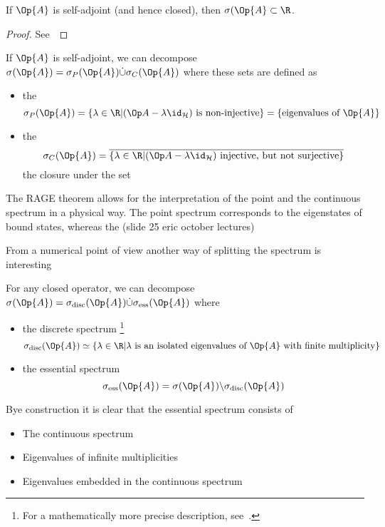 \begin{prop}
	If $\Op{A}$ is self-adjoint (and hence closed), then $\sigma(\Op{A}\subset \R$.
	\begin{proof}
		See~\cite[p. 102]{Helffer2013}
	\end{proof}
\end{prop}

\begin{defn}
	If $\Op{A}$ is self-adjoint, we can decompose $\sigma(\Op{A}) = \sigma_P(\Op{A}) \dot{\cup} \sigma_C(\Op{A})$ where these sets are defined as
	\begin{itemize}
		\item the 
			\[ \sigma_P(\Op{A}) = \left\{ \lambda \in \R \middle| \shiftop\ \text{is non-injective} \right\}
				= \{ \text{eigenvalues of $\Op{A}$} \}\]
		\item the 
			\[ \sigma_C(\Op{A}) = \overline{\left\{ \lambda \in \R \middle| \shiftop\ \text{injective, but not surjective} \right\}}\]
			\ie the closure under the set
	\end{itemize}
\end{defn}
The RAGE theorem allows for the interpretation of the
point and the continuous spectrum in a physical way.
The point spectrum corresponds to the eigenstates of bound states,
whereas the (slide 25 eric october lectures)

From a numerical point of view another way of splitting the spectrum is interesting
\begin{defn}
	For any closed operator, we can decompose $\sigma(\Op{A}) = \sigma_\text{disc}(\Op{A}) \dot{\cup} \sigma_\text{ess}(\Op{A})$
	where
	\begin{itemize}
		\item the discrete spectrum%
			\footnote{For a mathematically more precise description, see~\cite[p.103 and p.132]{Helffer2013}.}
			\[ \sigma_\text{disc}(\Op{A}) \simeq \left\{ \lambda \in \R \middle| \text{$\lambda$ is an isolated eigenvalues of $\Op{A}$ with finite multiplicity} \right\} \]
		\item the essential spectrum
			\[\sigma_\text{ess}(\Op{A}) = \sigma(\Op{A}) \backslash \sigma_\text{disc}(\Op{A})\]
	\end{itemize}
\end{defn}
Bye construction it is clear that the essential spectrum consists of
\begin{itemize}
	\item The continuous spectrum
	\item Eigenvalues of infinite multiplicities
	\item Eigenvalues embedded in the continuous spectrum
\end{itemize}

